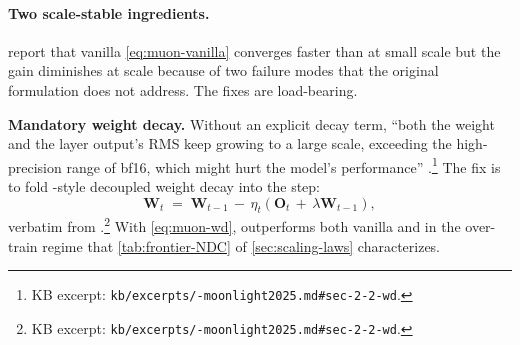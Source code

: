 \paragraph{Two scale-stable ingredients.}
\citet[\S 2.2]{muon-moonlight2025} report that vanilla
\cref{eq:muon-vanilla} converges faster than  at small scale but
the gain diminishes at  scale because of two failure modes that
the original formulation does not address. The fixes are
load-bearing.

\textbf{Mandatory weight decay.} Without an explicit decay term,
``both the weight and the layer output's RMS keep growing to a large
scale, exceeding the high-precision range of bf16, which might hurt
the model's performance''
\citep[\S 2.2]{muon-moonlight2025}.\footnote{KB excerpt:
\texttt{kb/excerpts/-moonlight2025.md\#sec-2-2-wd}.} The fix is
to fold -style decoupled weight decay into the  step:
\begin{equation}
\mathbf{W}_t \;=\; \mathbf{W}_{t-1} \,-\, \eta_t \!\left(
   \mathbf{O}_t \,+\, \lambda \mathbf{W}_{t-1}
\right),
\label{eq:muon-wd}
\end{equation}
verbatim from \citet[\S 2.2, eq.\ 3]{muon-moonlight2025}.\footnote{KB
excerpt: \texttt{kb/excerpts/-moonlight2025.md\#sec-2-2-wd}.}
With \cref{eq:muon-wd},  outperforms both vanilla  and 
in the over-train regime that \cref{tab:frontier-NDC} of
\cref{sec:scaling-laws} characterizes.

